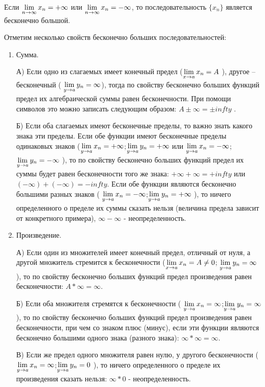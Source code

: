 \documentclass{article}
\begin{document}


Если $\lim\limits_{n \to \infty} x_n=+\infty$ или $\lim\limits_{n \to \infty} x_n=-\infty$, то последовательность $\{x_n\}$ является бесконечно большой.


Отметим несколько свойств бесконечно больших последовательностей:
\begin{enumerate}
	\item{} Сумма.


	А) Если одно из слагаемых имеет конечный предел ($\lim\limits_{x \to a}x_n=A$ ), другое – бесконечный ( $\lim\limits_{y \to a}y_n=\infty$), тогда по свойству бесконечно больших функций предел их алгебраической суммы равен бесконечности. При помощи символов это можно записать следующим образом: $A\pm \infty=\pm infty$ .

	Б) Если оба слагаемых имеют бесконечные пределы, то важно знать какого знака эти пределы. Если обе функции имеют бесконечные пределы одинаковых знаков ($\lim\limits_{y \to a}x_n=+\infty$;$\lim\limits_{y \to a}y_n=+\infty$  или $\lim\limits_{y \to a}x_n=-\infty$;$\lim\limits_{y \to a}y_n=-\infty$ ), то по свойству бесконечно больших функций предел их суммы будет равен бесконечности того же знака: $+\infty+\infty=+infty$ или $(-\infty)+(-\infty)=-infty$. Если обе функции являются бесконечно большими разных знаков ( $\lim\limits_{y \to a}x_n=-\infty$;$\lim\limits_{y \to a}y_n=+\infty$ ), то ничего определенного о пределе их суммы сказать нельзя (величина предела зависит от конкретного примера), $\infty - \infty$ - неопределенность.

	\item{} Произведение.

	А) Если один из множителей имеет конечный предел, отличный от нуля, а другой множитель стремится к бесконечности ($\lim\limits_{x \to a}x_n=A\neq 0$; $\lim\limits_{y \to a}y_n=\infty$), то по свойству бесконечно больших функций предел произведения равен бесконечности: $A*\infty=\infty$.

	Б) Если оба множителя стремятся к бесконечности ( $\lim\limits_{y \to a}x_n=\infty$;$\lim\limits_{y \to a}y_n=\infty$), то по свойству бесконечно больших функций предел произведения равен бесконечности, при чем со знаком плюс (минус), если эти функции являются бесконечно большими одного знака (разного знака):  $\infty*\infty=\infty$.

	В) Если же предел одного множителя равен нулю, у другого бесконечности ($\lim\limits_{y \to a}x_n=\infty$;$\lim\limits_{y \to a}y_n=0$ ), то ничего определенного о пределе их произведения сказать нельзя:  $\infty*0$ - неопределенность.


\end{enumerate}
\end{document}
